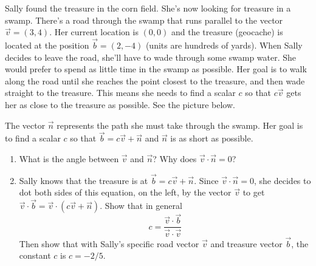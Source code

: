 \begin{problem}
 Sally found the treasure in the corn field.  She's now looking for treasure in a swamp. There's a road through the swamp that runs parallel to the vector $\vec v=(3,4)$. Her current location is $(0,0)$ and the treasure (geocache) is located at the position $\vec b=(2,-4)$ (units are hundreds of yards). When Sally decides to leave the road, she'll have to wade through some swamp water. She would prefer to spend as little time in the swamp as possible. Her goal is to walk along the road until she reaches the point closest to the treasure, and then wade straight to the treasure.  This means she needs to find a scalar $c$ so that $c\vec v$ gets her as close to the treasure as possible. See the picture below. 
\begin{center}	
\quad 
{}
\end{center}
The vector $\vec n$ represents the path she must take through the swamp. Her goal is to find a scalar $c$ so that $\vec b=c\vec v+\vec n$ and $\vec n$ is as short as possible. 
\begin{enumerate}
 \item What is the angle between $\vec v$ and $\vec n$? Why does $\vec v\cdot \vec n=0$?
 \item Sally knows that the treasure is at $\vec b = c\vec v+\vec n$.  Since $\vec v\cdot \vec n = 0$, she decides to dot both sides of this equation, on the left, by the vector $\vec v$ to get $\vec v\cdot \vec b = \vec v\cdot (c\vec v+\vec n)$. Show that in general $$c = \dfrac{\vec v\cdot \vec b}{\vec v\cdot \vec v} 
$$ Then show that with Sally's specific road vector $\vec v$ and treasure vector $\vec b$, the constant $c$ is $c=-2/5$. 
\end{enumerate}
 \end{problem}
 
